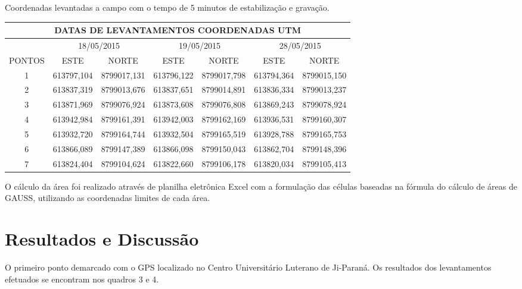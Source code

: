 \documentclass[article,12pt,onesidea,4paper,english,brazil]{abntex2}
\begin{document}
\begin{quadro}[!h]
	\centering
	\caption{Coordenadas levantadas a campo com o tempo de 5 minutos de estabilização e gravação.}
	\label{my-label}
	\begin{tabular}{|c|c|c|c|c|c|c|}
		\hline
		\multicolumn{7}{|c|}{DATAS DE LEVANTAMENTOS COORDENADAS UTM}                                                 \\ \hline
		& \multicolumn{2}{c|}{18/05/2015} & \multicolumn{2}{c|}{19/05/2015} & \multicolumn{2}{c|}{28/05/2015} \\ \hline
		PONTOS & ESTE           & NORTE          & ESTE           & NORTE          & ESTE           & NORTE          \\ \hline
		1      & 613797,104     & 8799017,131    & 613796,122     & 8799017,798    & 613794,364     & 8799015,150    \\ \hline
		2      & 613837,319     & 8799013,676    & 613837,651     & 8799014,891    & 613836,334     & 8799013,237    \\ \hline
		3      & 613871,969     & 8799076,924    & 613873,608     & 8799076,808    & 613869,243     & 8799078,924    \\ \hline
		4      & 613942,984     & 8799161,391    & 613942,003     & 8799162,169    & 613936,531     & 8799160,307    \\ \hline
		5      & 613932,720     & 8799164,744    & 613932,504     & 8799165,519    & 613928,788     & 8799165,753    \\ \hline
		6      & 613866,089     & 8799147,389    & 613866,098     & 8799150,043    & 613862,704     & 8799148,396    \\ \hline
		7      & 613824,404     & 8799104,624    & 613822,660     & 8799106,178    & 613820,034     & 8799105,413    \\ \hline
	\end{tabular}
\end{quadro}

O cálculo da área foi realizado através de planilha eletrônica Excel com a formulação das células baseadas na fórmula do cálculo de áreas de GAUSS, utilizando as coordenadas limites de cada área.

	
	\section*{Resultados e Discussão}
	
	O primeiro ponto demarcado com o GPS localizado no Centro Universitário Luterano de Ji-Paraná.
	Os resultados dos levantamentos efetuados se encontram nos quadros 3 e 4. 
	
\end{document}
